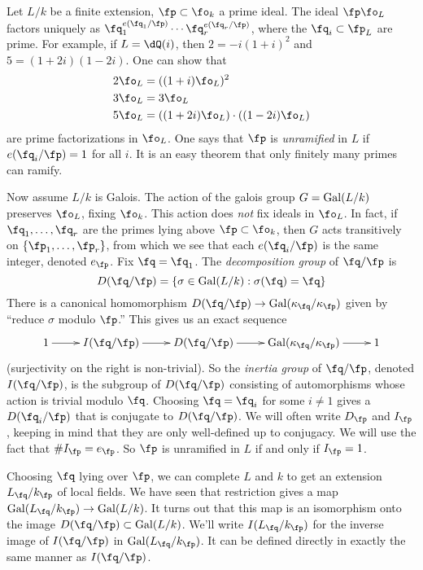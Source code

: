 Let $L/k$ be a finite extension, $\fp\subset \fo_k$ a prime ideal. The ideal 
$\fp\fo_L$ factors uniquely as 
$\fq_1^{e(\fq_1/\fp)}\dotsm\fq_r^{e(\fq_r/\fp)}$, where the $\fq_i\subset\fp_L$ 
are prime. For example, if $L=\dQ(i)$, then $2=-i(1+i)^2$ and $5=(1+2i)(1-2i)$. 
One can show that 
\begin{align*}
  2\fo_L &= ((1+i)\fo_L)^2 \\
  3\fo_L &= 3\fo_L \\
  5\fo_L &= ((1+2i)\fo_L)\cdot ((1-2i)\fo_L)
\end{align*}
are prime factorizations in $\fo_L$. One says that $\fp$ is \emph{unramified} 
in $L$ if $e(\fq_i/\fp)=1$ for all $i$. It is an easy theorem that only 
finitely many primes can ramify. 

Now assume $L/k$ is Galois. The action of the galois group $G=\operatorname{Gal}(L/k)$ 
preserves $\fo_L$, fixing $\fo_k$. This action does \emph{not} fix ideals in 
$\fo_L$. In fact, if $\fq_1,\dots,\fq_r$ are the primes lying above 
$\fp\subset \fo_k$, then $G$ acts transitively on $\{\fp_1,\dots,\fp_r\}$, 
from which we see that each $e(\fq_i/\fp)$ is the same integer, denoted 
$e_\fp$. Fix $\fq=\fq_1$. The \emph{decomposition group} of $\fq/\fp$ is 
\[
  D(\fq/\fp) = \{\sigma\in \gal(L/k) : \sigma(\fq) = \fq\}
\]
There is a canonical homomorphism 
$D(\fq/\fp) \to \gal(\kappa_\fq/\kappa_\fp)$ given by ``reduce $\sigma$ modulo 
$\fp$.'' This gives us an exact sequence 
\[\xymatrix{
  1 \ar[r] 
    & I(\fq/\fp) \ar[r] 
    & D(\fq/\fp) \ar[r] 
    & \gal(\kappa_\fq/\kappa_\fp) \ar[r] 
    & 1
}\]
(surjectivity on the right is non-trivial). So the \emph{inertia 
group} of $\fq/\fp$, denoted $I(\fq/\fp)$, is the subgroup of $D(\fq/\fp)$ 
consisting of automorphisms whose action is trivial modulo $\fq$. Choosing 
$\fq=\fq_i$ for some $i\ne 1$ gives a $D(\fq_i/\fp)$ that is conjugate to 
$D(\fq/\fp)$. We will often write $D_\fp$ and $I_\fp$, keeping in mind that 
they are only well-defined up to conjugacy. We will use the fact that 
$\# I_\fp = e_\fp$. So $\fp$ is unramified in $L$ if and only if 
$I_\fp = 1$. 

Choosing $\fq$ lying over $\fp$, we can complete $L$ and $k$ to get an 
extension $L_\fq/k_\fp$ of local fields. We have seen that restriction 
gives a map $\gal(L_\fq/k_\fp) \to \gal(L/k)$. It turns out that this map is an 
isomorphism onto the image $D(\fq/\fp)\subset \gal(L/k)$. We'll write 
$I(L_\fq/k_\fp)$ for the inverse image of $I(\fq/\fp)$ in 
$\gal(L_\fq/k_\fp)$. It can be defined directly in exactly the same manner as 
$I(\fq/\fp)$. 

